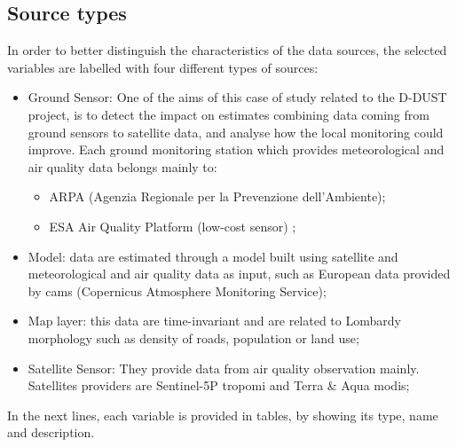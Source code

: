 \subsection{Source types}
In order to better distinguish the characteristics of the data sources, the selected variables are labelled with four different types of sources:
\begin{itemize}

\item Ground Sensor: One of the aims of this case of study related to the D-DUST project, is to detect the impact on estimates combining data coming from ground sensors to satellite data, and analyse how the local monitoring could improve.  
Each ground monitoring station which provides meteorological and air quality data belongs mainly to: 
\begin{itemize}
    \item ARPA (Agenzia Regionale per la Prevenzione dell'Ambiente);
    \item ESA Air Quality Platform (low-cost sensor) \cite{esasensor};
\end{itemize}  
\item Model: data are estimated through a model built using satellite and meteorological and air quality data as input, such as European data provided by \acrshort{cams} (Copernicus Atmosphere Monitoring Service);
\item Map layer: this data are time-invariant and are related to Lombardy morphology such as density of roads, population or land use; 
\item Satellite Sensor: They provide data from air quality observation mainly. Satellites providers are Sentinel-5P \acrshort{tropomi} and Terra \& Aqua \acrshort{modis};
\end{itemize}
\bigbreak

In the next lines, each variable is provided in tables, by showing its type, name and description.
\pagebreak
